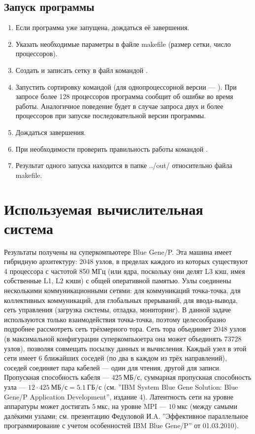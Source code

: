 \documentclass[14pt]{extarticle}
\begin{document}
\subsection{Запуск программы}
\begin{enumerate}
\item Если программа уже запущена, дождаться её завершения.
\item Указать необходимые параметры в файле makefile (размер сетки, число процессоров).
\item Создать и записать сетку в файл командой .
\item Запустить сортировку командой  (для однопроцессорной версии --- ). При запросе более 128 процессоров программа сообщит об ошибке во время работы. Аналогичное поведение будет в случае запроса двух и более процессоров при запуске последовательной версии программы.
\item Дождаться завершения.
\item При необходимости проверить правильность работы командой .
\item Результат одного запуска находится в папке ../out/ относительно файла makefile.
\end{enumerate}


\section{Используемая вычислительная система}
Результаты получены на суперкомпьютере Blue Gene/P. Эта машина имеет гибридную архитектуру: 2048 узлов, в пределах каждого из которых существуют 4 процессора с частотой 850 МГц (или ядра, поскольку они делят L3 кэш, имея собственные L1, L2 кэши) с общей оперативной памятью. Узлы соединены несколькими коммуникационными сетями: для коммуникаций точка-точка, для коллективных коммуникаций, для глобальных прерываний, для ввода-вывода, сеть управления (загрузка системы, отладка, мониторинг).  В данной задаче используются только взаимодействия точка-точка, поэтому целесообразно подробнее рассмотреть сеть трёхмерного тора. Сеть тора объединяет 2048 узлов (в максимальной конфигурации суперкомпьюетра она может объединять 73728 узлов), позволяя совмещать посылку данных и вычисления. Каждый узел в этой сети имеет 6 ближайших соседей (по два в каждом из трёх направлений), соседей соединяет пара кабелей --- один для чтения, другой для записи. Пропускная способность кабеля --- $425~ \text{МБ/с}$, суммарная пропускная способность узла --- $ 12 \cdot 425~ \text{МБ/с} = 5.1~ \text{ГБ/с}$ (см. ''IBM System Blue Gene Solution: Blue Gene/P Application Development'', издание 4). Латентность сети на уровне аппаратуры может достигать $5~\text{мкс}$, на уровне MPI --- $10~\text{мкс}$ (между самыми далёкими узлами; см. презентацию Федуловой И.A. ''Эффективное параллельное программирование с учетом особенностей IBM Blue Gene/P'' от 01.03.2010).
\end{document}
